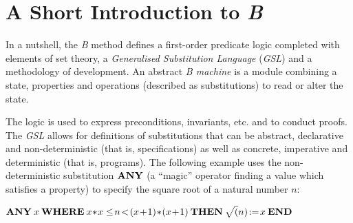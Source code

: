 \documentclass{llncs}
\begin{document}
\section{A Short Introduction to \emph{B}}\label{sc_introb}

In a nutshell, the \emph{B} method defines a first-order predicate logic completed with 
elements of set theory, a \emph{Generalised Substitution Language} (\emph{GSL}) and a 
methodology of development. An abstract \emph{B machine} is a module combining a state, 
properties and operations (described as substitutions) to read or alter the state.

The logic is used to express preconditions, invariants, etc. and to conduct proofs. The 
\emph{GSL} allows for definitions of substitutions that can be abstract, declarative and 
non-deterministic (that is, specifications) as well as concrete, imperative and deterministic 
(that is, programs). The following example uses the non-deterministic substitution 
$\mathbf{ANY}$ (a ``magic'' operator finding a value which satisfies a property) to specify the 
square root of a natural number $n$:
\begin{example}\small$\Bcmd{ANY}\:x\:\Bcmd{WHERE}\:x\!*\!x\leq\!n\!<\!(x\!+\!1)\!*\!(x\!+\!1)\:
\Bcmd{THEN}\:\sqrt(n)\!:=\!x\:\Bcmd{END}$
\end{example}
\end{document}
